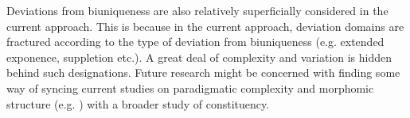 \documentclass[output=paper,draftmode]{langscibook}
\begin{document}
Deviations from biuniqueness are also relatively superficially considered in the current approach. This is because in the current approach, deviation domains are fractured according to the type of deviation from biuniqueness (e.g. extended exponence, suppletion etc.). A great deal of complexity and variation is hidden behind such designations. Future research might be concerned with finding some way of syncing current studies on paradigmatic complexity and morphomic structure (e.g. \citealt[]{borja2023typological}) with a broader study of constituency. 


\printbibliography[heading=subbibliography,notkeyword=this]
\end{document}
